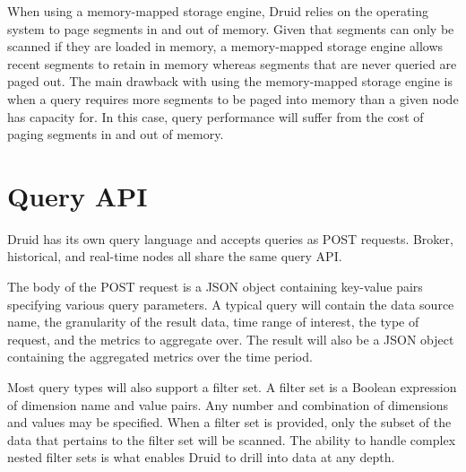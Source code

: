 \documentclass{acm_proc_article-sp}
\begin{document}
When using a memory-mapped storage engine, Druid relies on the operating system
to page segments in and out of memory.  Given that segments can only be scanned
if they are loaded in memory, a memory-mapped storage engine allows recent
segments to retain in memory whereas segments that are never queried are paged
out. The main drawback with using the memory-mapped storage engine is when a
query requires more segments to be paged into memory than a given node has
capacity for. In this case, query performance will suffer from the cost of
paging segments in and out of memory.

\section{Query API}
\label{sec:query-api}
Druid has its own query language and accepts queries as POST requests. Broker,
historical, and real-time nodes all share the same query API.

The body of the POST request is a JSON object containing key-value pairs
specifying various query parameters. A typical query will contain the data
source name, the granularity of the result data, time range of interest, the
type of request, and the metrics to aggregate over. The result will also be a
JSON object containing the aggregated metrics over the time period.

Most query types will also support a filter set. A filter set is a Boolean
expression of dimension name and value pairs. Any number and combination of
dimensions and values may be specified.  When a filter set is provided, only
the subset of the data that pertains to the filter set will be scanned.  The
ability to handle complex nested filter sets is what enables Druid to drill
into data at any depth.
\end{document}
